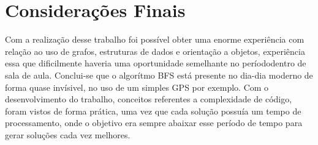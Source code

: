 \chapter[Considerações Finais]{Considerações Finais}

Com a realização desse trabalho foi possível obter uma enorme experiência com relação ao uso de grafos, estruturas de dados e orientação a objetos, experiência essa que dificilmente haveria uma oportunidade semelhante no períododentro de sala de aula. Conclui-se que o algorítmo BFS está presente no dia-dia moderno de forma quase invísivel, no uso de um simples GPS por exemplo. Com o desenvolvimento do trabalho, conceitos referentes a complexidade de código, foram vistos de forma prática, uma vez que cada solução possuía um tempo de processamento, onde o objetivo era sempre abaixar esse período de tempo para gerar soluções cada vez melhores.
